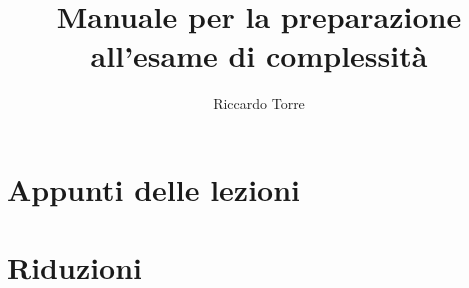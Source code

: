 \documentclass[italian,10pt,a4paper]{report}
\title{Manuale per la preparazione all'esame di complessità}
\author{Riccardo Torre}
\begin{document}
	\maketitle
	\chapter{Appunti delle lezioni}
	\chapter{Riduzioni}
	
\end{document}

